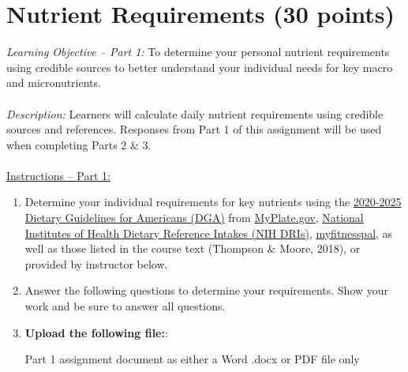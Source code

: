 \documentclass[
	title={Dietary Analysis Assignment - Nutrient Requirements},
	points={30}
]{fdsn201homework}
\begin{document}
\maketitle

\chapter{Nutrient Requirements (30 points)}
\textit{Learning Objective -- Part 1:} To determine your personal nutrient requirements using credible sources to better understand your individual needs for key macro and micronutrients.\\\\
%
\textit{Description:} Learners will calculate daily nutrient requirements using credible sources and references.
Responses from Part 1 of this assignment will be used when completing Parts 2 \& 3.\\\\
%
\ul{Instructions -- Part 1:}
\begin{enumerate}[label=\arabic*.]
	\item Determine your individual requirements for key nutrients using the
	\href{https://www.dietaryguidelines.gov/sites/default/files/2020-12/Dietary_Guidelines_for_Americans_2020-2025.pdf}{2020-2025 Dietary Guidelines for Americans (DGA)}
	from
	\href{https://www.myplate.gov/}{MyPlate.gov},
	\href{https://ods.od.nih.gov/HealthInformation/nutrientrecommendations.aspx#:~:text=Recommended%20Dietary%20Allowance%20(RDA)%3A,assumed%20to%20ensure%20nutritional%20adequacy.}{National Institutes of Health Dietary Reference Intakes (NIH DRIs)},
	\href{https://www.myfitnesspal.com/}{myfitnesspal}, as well as those listed in the course text (Thompson \& Moore, 2018), or provided by instructor below.
	\item Answer the following questions to determine your requirements.
	Show your work and be sure to answer all questions.
	\item \textbf{Upload the following file:}:

	Part 1 assignment document as either a Word .docx or PDF file only
\end{enumerate}
\end{document}
